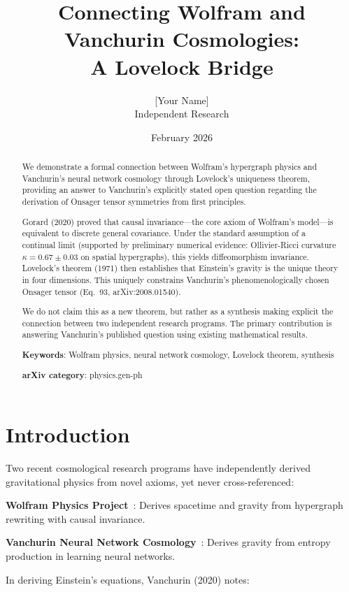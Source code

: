 \documentclass[11pt]{article}
\title{Connecting Wolfram and Vanchurin Cosmologies:\\
A Lovelock Bridge}
\author{[Your Name]\\
Independent Research}
\date{February 2026}
\begin{document}
\maketitle

\begin{abstract}
We demonstrate a formal connection between Wolfram's hypergraph physics and Vanchurin's neural network cosmology through Lovelock's uniqueness theorem, providing an answer to Vanchurin's explicitly stated open question regarding the derivation of Onsager tensor symmetries from first principles.

Gorard (2020) proved that causal invariance—the core axiom of Wolfram's model—is equivalent to discrete general covariance. Under the standard assumption of a continual limit (supported by preliminary numerical evidence: Ollivier-Ricci curvature $\kappa=0.67\pm0.03$ on spatial hypergraphs), this yields diffeomorphism invariance. Lovelock's theorem (1971) then establishes that Einstein's gravity is the unique theory in four dimensions. This uniquely constrains Vanchurin's phenomenologically chosen Onsager tensor (Eq.~93, arXiv:2008.01540).

We do not claim this as a new theorem, but rather as a synthesis making explicit the connection between two independent research programs. The primary contribution is answering Vanchurin's published question using existing mathematical results.

\textbf{Keywords}: Wolfram physics, neural network cosmology, Lovelock theorem, synthesis

\textbf{arXiv category}: physics.gen-ph
\end{abstract}

\section{Introduction}

Two recent cosmological research programs have independently derived gravitational physics from novel axioms, yet never cross-referenced:

\textbf{Wolfram Physics Project}~\cite{Gorard2020,Wolfram2020}: Derives spacetime and gravity from hypergraph rewriting with causal invariance.

\textbf{Vanchurin Neural Network Cosmology}~\cite{Vanchurin2020,Vanchurin2025}: Derives gravity from entropy production in learning neural networks.

In deriving Einstein's equations, Vanchurin (2020) notes:
\end{document}
